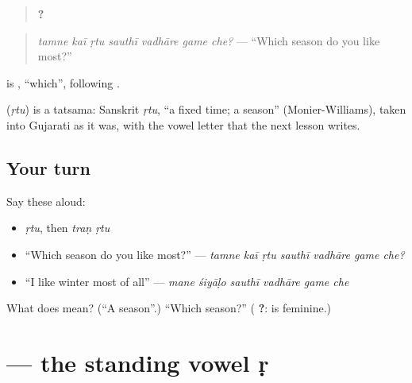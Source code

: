 \begin{quote}
\textbf{      ?}
\end{quote}

\begin{quote}
\emph{tamne kaī ṛtu sauthī vadhāre game che?} — \textquotedblleft{}Which season do you like most?\textquotedblright{}
\end{quote}

\textbf{} is \textbf{}, \textquotedblleft{}which\textquotedblright{}, following \textbf{}.

\begin{cousinweb}
\textbf{} (\emph{ṛtu}) is a tatsama: Sanskrit \emph{ṛtu}, \textquotedblleft{}a fixed time; a season\textquotedblright{} (Monier-Williams), taken into Gujarati as it was, with the vowel letter \textbf{} that the next lesson writes.
\end{cousinweb}

\subsection*{Your turn}
Say these aloud:

\begin{itemize}
\raggedright
  \item \emph{ṛtu}, then \emph{traṇ ṛtu}
  \item \textquotedblleft{}Which season do you like most?\textquotedblright{} — \emph{tamne kaī ṛtu sauthī vadhāre game che?}
  \item \textquotedblleft{}I like winter most of all\textquotedblright{} — \emph{mane śiyāḷo sauthī vadhāre game che}
\end{itemize}

\begin{tcolorbox}[breakable,colback=teal!4,colframe=teal!35!black,title={Before you move on}]
What does \textbf{} mean? (\textquotedblleft{}A season\textquotedblright{}.) \textquotedblleft{}Which season?\textquotedblright{} (\textbf{ ?}: \textbf{} is feminine.)
\end{tcolorbox}
\section[\texorpdfstring{\gu{ઋ} (ṛ)}{ઋ (ṛ)}]{ — the standing vowel ṛ}

\label{lesson:GU-W53-vocalic-r-letter}



